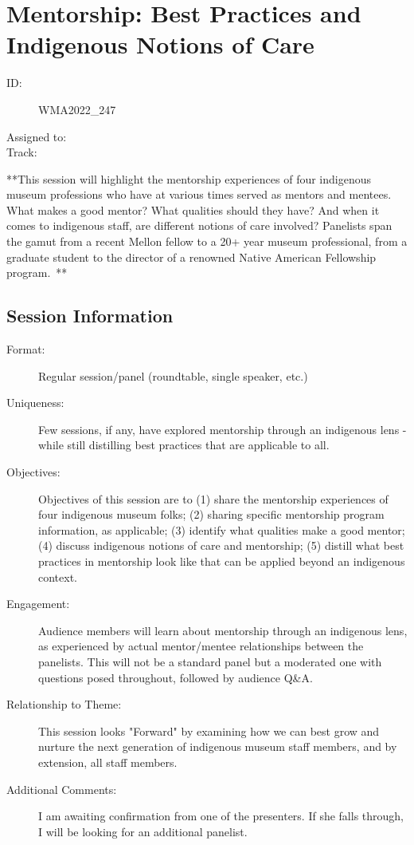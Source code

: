 \documentclass{report}
\begin{document}
              
        
          \newpage
          \section{ Mentorship: Best Practices and Indigenous Notions of Care }
            \begin{description}
              \item [ID:]
              WMA2022\_247

              \item [Assigned to:]
                \item [Track:]
              \end{description}

              **This session will highlight the mentorship experiences of four indigenous museum professions who have at various times served as mentors and mentees. What makes a good mentor? What qualities should they have? And when it comes to indigenous staff, are different notions of care involved? Panelists span the gamut from a recent Mellon fellow to a 20+ year museum professional, from a graduate student to the director of a renowned Native American Fellowship program. **

              \subsection*{Session Information}
                \begin{description}
                  \item [Format:] Regular session/panel (roundtable, single speaker, etc.)
							    
							    \item [Uniqueness:]Few sessions, if any, have explored mentorship through an indigenous lens - while still distilling best practices that are applicable to all.
							    \item [Objectives:]Objectives of this session are to (1) share the mentorship experiences of four indigenous museum folks; (2) sharing specific mentorship program information, as applicable; (3) identify what qualities make a good mentor; (4) discuss indigenous notions of care and mentorship; (5) distill what best practices in mentorship look like that can be applied beyond an indigenous context.
							    \item [Engagement:]Audience members will learn about mentorship through an indigenous lens, as experienced by actual mentor/mentee relationships between the panelists. This will not be a standard panel but a moderated one with questions posed throughout, followed by audience Q\&A.
							    \item [Relationship to Theme:]This session looks "Forward" by examining how we can best grow and nurture the next generation of indigenous museum staff members, and by extension, all staff members.
							    
                    \item [Additional Comments: ]I am awaiting confirmation from one of the presenters. If she falls through, I will be looking for an additional panelist. 

                \end{description}
\end{document}
